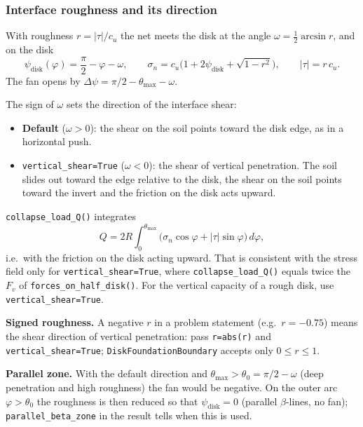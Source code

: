 \documentclass[11pt,a4paper]{article}
\begin{document}
\subsubsection*{Interface roughness and its direction}

With roughness $r = |\tau|/c_u$ the net meets the disk at the angle
$\omega = \tfrac12\arcsin r$, and on the disk
\begin{equation}
  \psi_\text{disk}(\varphi) = \frac{\pi}{2} - \varphi - \omega,
  \qquad
  \sigma_n = c_u\bigl(1 + 2\psi_\text{disk} + \sqrt{1-r^2}\bigr),
  \qquad
  |\tau| = r\,c_u .
\end{equation}
The fan opens by $\Delta\psi = \pi/2 - \theta_{\max} - \omega$.

The sign of $\omega$ sets the direction of the interface shear:
\begin{itemize}
  \item \textbf{Default} ($\omega > 0$): the shear on the soil points
        toward the disk edge, as in a horizontal push.
  \item \texttt{vertical\_shear=True} ($\omega < 0$): the shear of
        vertical penetration.  The soil slides out toward the edge
        relative to the disk, the shear on the soil points toward the
        invert and the friction on the disk acts upward.
\end{itemize}
\texttt{collapse\_load\_Q()} integrates
\begin{equation}
  Q = 2R\int_0^{\theta_{\max}}\bigl(\sigma_n\cos\varphi + |\tau|\sin\varphi\bigr)\,d\varphi,
\end{equation}
i.e.\ with the friction on the disk acting upward.  That is consistent
with the stress field only for \texttt{vertical\_shear=True}, where
\texttt{collapse\_load\_Q()} equals twice the $F_v$ of
\texttt{forces\_on\_half\_disk()}.
For the vertical capacity of a rough disk, use
\texttt{vertical\_shear=True}.

\textbf{Signed roughness.}  A negative $r$ in a problem statement
(e.g.\ $r = -0.75$) means the shear direction of vertical penetration:
pass \texttt{r=abs(r)} and \texttt{vertical\_shear=True};
\texttt{DiskFoundationBoundary} accepts only $0 \le r \le 1$.

\textbf{Parallel zone.}  With the default direction and
$\theta_{\max} > \theta_0 = \pi/2 - \omega$ (deep penetration and high
roughness) the fan would be negative.  On the outer arc
$\varphi > \theta_0$ the roughness is then reduced so that
$\psi_\text{disk} = 0$ (parallel $\beta$-lines, no fan);
\texttt{parallel\_beta\_zone} in the result tells when this is used.
\end{document}
